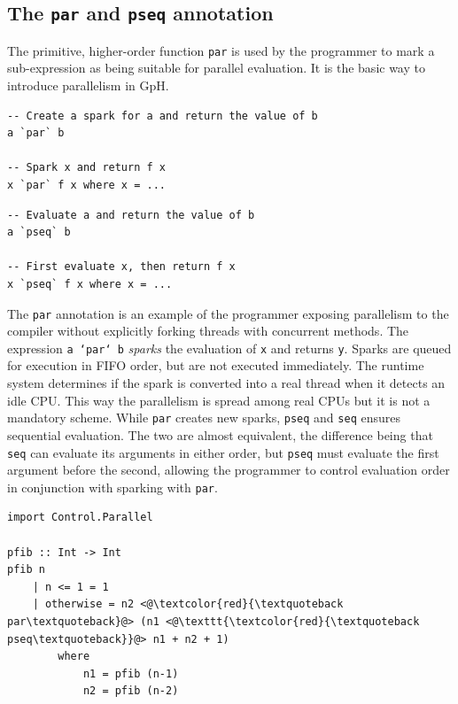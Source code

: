 \documentclass[CS4204-Notes.tex]{subfiles}
\begin{document}
\subsection{The \texttt{par} and \texttt{pseq} annotation}
The primitive, higher-order function \texttt{par} is used by the programmer to mark a sub-expression as being suitable for parallel evaluation. It is the basic way to introduce parallelism in GpH.
\begin{lstlisting}[caption={Example of the \texttt{par} annotation.}]
-- Create a spark for a and return the value of b
a `par` b

-- Spark x and return f x
x `par` f x where x = ...
\end{lstlisting}
\begin{lstlisting}[caption={Example of the \texttt{pseq} annotation.}]
-- Evaluate a and return the value of b
a `pseq` b

-- First evaluate x, then return f x
x `pseq` f x where x = ...
\end{lstlisting}
The \texttt{par} annotation is an example of the programmer exposing parallelism to the compiler without explicitly forking threads with concurrent methods. The expression \texttt{a `par` b} \textit{sparks} the evaluation of \texttt{x} and returns \texttt{y}. Sparks are queued for execution in FIFO order, but are not executed immediately. The runtime system determines if the spark is converted into a real thread when it detects an idle CPU. This way the parallelism is spread among real CPUs but it is not a mandatory scheme. 
\n
While \texttt{par} creates new sparks, \texttt{pseq} and \texttt{seq} ensures sequential evaluation. The two are almost equivalent, the difference being that \texttt{seq} can evaluate its arguments in either order, but \texttt{pseq} must evaluate the first argument before the second, allowing the programmer to control evaluation order in conjunction with sparking with \texttt{par}.
\def\textquoteback{\`{}}
\begin{lstlisting}[caption={Parallel Fibonacci}]
import Control.Parallel

pfib :: Int -> Int
pfib n 
	| n <= 1 = 1
	| otherwise	= n2 <@\textcolor{red}{\textquoteback par\textquoteback}@> (n1 <@\texttt{\textcolor{red}{\textquoteback pseq\textquoteback}}@> n1 + n2 + 1)
		where
			n1 = pfib (n-1)
			n2 = pfib (n-2)
\end{lstlisting}
\end{document}
